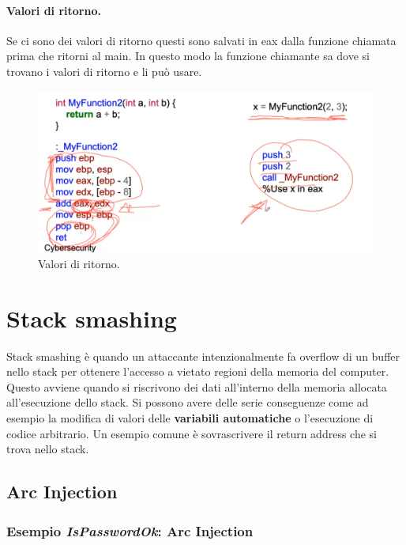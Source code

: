 \paragraph{Valori di ritorno.} Se ci sono dei valori di ritorno questi sono salvati
in eax dalla funzione chiamata prima che ritorni al main. In questo modo la
funzione chiamante sa dove si trovano i valori di ritorno e li può usare.

\begin{figure}[H]
    \centering
    \includegraphics[width=13cm, keepaspectratio]{capitoli/secure_coding/img/cap_2/return_values.png}
    \caption{Valori di ritorno.}\label{fig:ret_values}
\end{figure}

\section{Stack smashing}

Stack smashing è quando un attaccante intenzionalmente fa overflow di un buffer nello
stack per ottenere l'accesso a vietato regioni della memoria del computer.
Questo avviene quando si riscrivono dei dati all'interno della memoria allocata
all'esecuzione dello stack. Si possono avere delle serie conseguenze come ad esempio
la modifica di valori delle \textbf{variabili automatiche} o l'esecuzione di codice
arbitrario. Un esempio comune è sovrascrivere il return address che si trova nello
stack.

\subsection{Arc Injection}

\subsubsection{Esempio \textit{IsPasswordOk}: Arc Injection}

